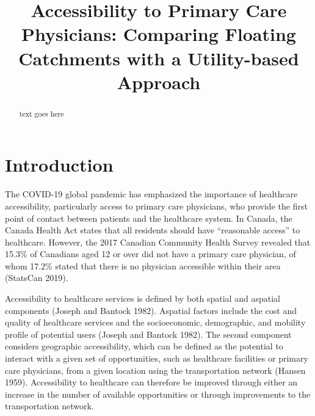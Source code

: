 \documentclass{article}
\title{Accessibility to Primary Care Physicians: Comparing Floating
Catchments with a Utility-based Approach}
\author{
  }
\begin{document}
\maketitle

\def\tightlist{}


\begin{abstract}
text goes here
\end{abstract}


\hypertarget{introduction}{%
\section{Introduction}\label{introduction}}

The COVID-19 global pandemic has emphasized the importance of healthcare
accessibility, particularly access to primary care physicians, who
provide the first point of contact between patients and the healthcare
system. In Canada, the Canada Health Act states that all residents
should have ``reasonable access'' to healthcare. However, the 2017
Canadian Community Health Survey revealed that 15.3\% of Canadians aged
12 or over did not have a primary care physician, of whom 17.2\% stated
that there is no physician accessible within their area (StatsCan 2019).

Accessibility to healthcare services is defined by both spatial and
aspatial components (Joseph and Bantock 1982). Aspatial factors include
the cost and quality of healthcare services and the socioeconomic,
demographic, and mobility profile of potential users (Joseph and Bantock
1982). The second component considers geographic accessibility, which
can be defined as the potential to interact with a given set of
opportunities, such as healthcare facilities or primary care physicians,
from a given location using the transportation network (Hansen 1959).
Accessibility to healthcare can therefore be improved through either an
increase in the number of available opportunities or through
improvements to the transportation network.
\end{document}
